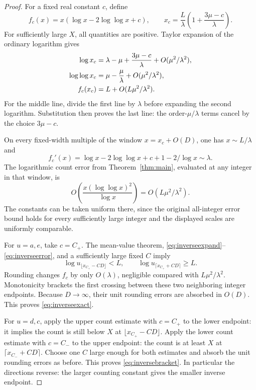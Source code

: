 \begin{proof}
For a fixed real constant $c$, define
\[
 f_c(x)=x(\log x-2\log\log x+c),\qquad
 x_c=\frac L\lambda\left(1+\frac{3\mu-c}{\lambda}\right).
\]
For sufficiently large $X$, all quantities are positive. Taylor expansion of the ordinary logarithm gives
\begin{align}
 \log x_c&=\lambda-\mu+\frac{3\mu-c}{\lambda}
                +O(\mu^2/\lambda^2),\notag\\
 \log\log x_c&=\mu-\frac\mu\lambda+O(\mu^2/\lambda^2),\notag\\
 f_c(x_c)&=L+O(L\mu^2/\lambda^2).\label{eq:inverseexpand}
\end{align}
For the middle line, divide the first line by $\lambda$ before expanding the second logarithm. Substitution then proves the last line: the order-$\mu/\lambda$ terms cancel by the choice $3\mu-c$.

On every fixed-width multiple of the window $x=x_c+O(D)$, one has $x\sim L/\lambda$ and
\begin{equation}\label{eq:slope}
 f_c'(x)=\log x-2\log\log x+c+1-2/\log x\sim\lambda.
\end{equation}
The logarithmic count error from Theorem~\ref{thm:main}, evaluated at any integer in that window, is
\begin{equation}\label{eq:inverseerror}
 O\!\left(\frac{x(\log\log x)^2}{\log x}\right)
       =O(L\mu^2/\lambda^2).
\end{equation}
The constants can be taken uniform there, since the original all-integer error bound holds for every sufficiently large integer and the displayed scales are uniformly comparable.

For $u=a,e$, take $c=C_+$. The mean-value theorem, \eqref{eq:inverseexpand}--\eqref{eq:inverseerror}, and a sufficiently large fixed $C$ imply
\[
 \log u_{\lfloor x_{C_+}-CD\rfloor}<L,
 \qquad
 \log u_{\lceil x_{C_+}+CD\rceil}\ge L.
\]
Rounding changes $f_c$ by only $O(\lambda)$, negligible compared with $L\mu^2/\lambda^2$. Monotonicity brackets the first crossing between these two neighboring integer endpoints. Because $D\to\infty$, their unit rounding errors are absorbed in $O(D)$. This proves \eqref{eq:inverseexact}.

For $u=d,c$, apply the upper count estimate with $c=C_+$ to the lower endpoint: it implies the count is still below $X$ at $\lfloor x_{C_+}-CD\rfloor$. Apply the lower count estimate with $c=C_-$ to the upper endpoint: the count is at least $X$ at $\lceil x_{C_-}+CD\rceil$. Choose one $C$ large enough for both estimates and absorb the unit rounding errors as before. This proves \eqref{eq:inversebracket}. In particular the directions reverse: the larger counting constant gives the smaller inverse endpoint.
\end{proof}
